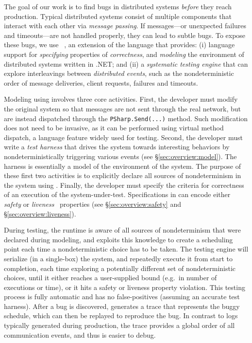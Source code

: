 The goal of our work is to find bugs in distributed systems \emph{before} they reach production. Typical distributed systems consist of multiple components that interact with each other via \emph{message passing}. If messages---or unexpected failures and timeouts---are not handled properly, they can lead to subtle bugs. To expose these bugs, we use \psharp~\cite{deligiannis2015psharp}, an extension of the \csharp language that provides: (i) language support for \emph{specifying} properties of \emph{correctness}, and \emph{modeling} the environment of distributed systems written in .NET; and (ii) a \emph{systematic testing engine} that can explore interleavings between \emph{distributed events}, such as the nondeterministic order of message deliveries, client requests, failures and timeouts.

Modeling using \psharp involves three core activities. First, the developer must modify the original system so that messages are not sent through the real network, but are instead dispatched through the \texttt{PSharp.Send(...)} method. Such modification does not need to be invasive, as it can be performed using virtual method dispatch, a \csharp language feature widely used for testing. Second, the developer must write a \psharp \emph{test harness} that drives the system towards interesting behaviors by nondeterministically triggering various events (see \S\ref{sec:overview:model}). The harness is essentially a model of the environment of the system. The purpose of these first two activities is to explicitly declare all sources of nondeterminism in the system using \psharp. Finally, the developer must specify the criteria for correctness of an execution of the system-under-test. Specifications in \psharp can encode either \emph{safety} or \emph{liveness}~\cite{lamport1977proving} properties (see \S\ref{sec:overview:safety} and \S\ref{sec:overview:liveness}).

During testing, the \psharp runtime is aware of all sources of nondeterminism that were declared during modeling, and exploits this knowledge to create a scheduling point each time a nondeterministic choice has to be taken. The \psharp testing engine will serialize (in a single-box) the system, and repeatedly execute it from start to completion, each time exploring a potentially different set of nondeterministic choices, until it either reaches a user-supplied bound (e.g.\ in number of executions or time), or it hits a safety or liveness property violation. This testing process is fully automatic and has no false-positives (assuming an accurate test harness). After a bug is discovered, \psharp generates a trace that represents the buggy schedule, which can then be replayed to reproduce the bug. In contrast to logs typically generated during production, the \psharp trace provides a global order of all communication events, and thus is easier to debug.


